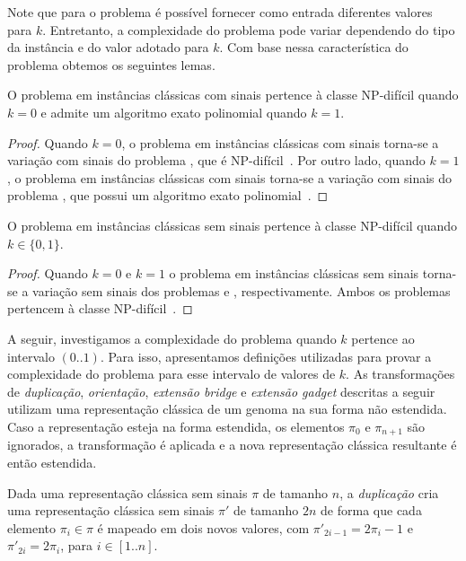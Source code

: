 Note que para o problema \SbPRT{} é possível fornecer como entrada diferentes valores para $k$. Entretanto, a complexidade do problema pode variar dependendo do tipo da instância e do valor adotado para $k$. Com base nessa característica do problema obtemos os seguintes lemas.

\begin{lemma}
O problema \SbPRT{} em instâncias clássicas com sinais pertence à classe NP-difícil quando $k=0$ e admite um algoritmo exato polinomial quando $k=1$.
\end{lemma}
\begin{proof}
Quando $k=0$, o problema \SbPRT{} em instâncias clássicas com sinais torna-se a variação com sinais do problema \SbRT{}, que é NP-difícil~\cite{2019b-oliveira-etal}. Por outro lado, quando $k=1$, o problema \SbPRT{} em instâncias clássicas com sinais torna-se a variação com sinais do problema \SbR{}, que possui um algoritmo exato polinomial~\cite{1999-hannenhalli-pevzner}.
\end{proof}

\begin{lemma}
O problema \SbPRT{} em instâncias clássicas sem sinais pertence à classe NP-difícil quando $k \in \{0,1\}$.
\end{lemma}
\begin{proof}
Quando $k=0$ e $k=1$ o problema \SbPRT{} em instâncias clássicas sem sinais torna-se a variação sem sinais dos problemas \SbRT{} e \SbR{}, respectivamente. Ambos os problemas pertencem à classe NP-difícil~\cite{2019b-oliveira-etal,1999a-caprara}.
\end{proof}

A seguir, investigamos a complexidade do problema \SbPRT{} quando $k$ pertence ao intervalo $(0..1)$. Para isso, apresentamos definições utilizadas para provar a complexidade do problema para esse intervalo de valores de $k$. As transformações de \emph{duplicação}, \emph{orientação}, \emph{extensão bridge} e \emph{extensão gadget} descritas a seguir utilizam uma representação clássica de um genoma na sua forma não estendida. Caso a representação esteja na forma estendida, os elementos $\pi_0$ e $\pi_{n+1}$ são ignorados, a transformação é aplicada e a nova representação clássica resultante é então estendida.

\begin{definition}
Dada uma representação clássica sem sinais $\pi$ de tamanho $n$, a \emph{duplicação} cria uma representação clássica sem sinais $\pi'$ de tamanho $2n$ de forma que cada elemento $\pi_i \in \pi$ é mapeado em dois novos valores, com $\pi'_{2i-1} = 2\pi_i-1$ e $\pi'_{2i} = 2\pi_i$, para $i \in [1..n]$.
\end{definition}

